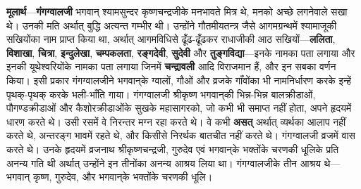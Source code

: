 \begin{sloppypar}\justifying{}
\textbf{मूलार्थ}—\textbf{गंगग्वालजी} भगवान् श्याम\-सुन्दर कृष्ण\-चन्द्रजीके मनभावते मित्र थे, मनको अच्छे लगनेवाले सखा थे। उनकी मति अर्थात् बुद्धि अत्यन्त गम्भीर थी। उन्होंने गौतमीय\-तन्त्र जैसे आगमग्रन्थमें श्यामाजूकी सखियोंका नाम प्राप्त किया था, अर्थात् आगमविधिसे ढूँढ-ढूँढकर राधाजीकी आठ सखियों—\textbf{ललिता}, \textbf{विशाखा}, \textbf{चित्रा}, \textbf{इन्दुलेखा}, \textbf{चम्पकलता}, \textbf{रङ्गदेवी}, \textbf{सुदेवी} और \textbf{तुङ्गविद्या}—इनके नामका पता लगाया और इनकी यूथेश्वरियोंके नामका पता लगाया जिनमें \textbf{चन्द्रावली} आदि विराजमान हैं, और इन सबका वर्णन किया। इसी प्रकार गंगग्वालजीने भगवान्‌के ग्वालों, गौओं और व्रजके गाँवोंका भी नाम\-निर्धारण करके इन्हें पृथक्-पृथक् करके भली-भाँति गाया। गंगग्वालजी श्रीकृष्ण भगवान्‌की भिन्न-भिन्न बाल\-क्रीडाओं, पौगण्ड\-क्रीडाओं और कैशोर\-क्रीडाओंके सुखके महासागरको, जो कभी भी समाप्त नहीं होता, अपने हृदयमें धारण करते थे। उसी रसमें वे निरन्तर मग्न रहा करते थे। वे कभी \textbf{असत्} अर्थात् व्यर्थका आलाप नहीं करते थे, अन्तरङ्ग भावमें रहते थे, और किसीसे निरर्थक बातचीत नहीं करते थे। गंगग्वालजी व्रजमें वास करते थे। उनके हृदयमें व्रजनाथ श्रीकृष्ण\-चन्द्रजी, गुरुदेव एवं भगवान्‌के भक्तोंके चरणकी धूलिके प्रति अनन्य गति थी अर्थात् उन्होंने इन तीनोंका अनन्य आश्रय लिया था। गंगग्वालजीके तीन आश्रय थे—भगवान् कृष्ण, गुरुदेव, और भगवान्‌के भक्तोंके चरणकी धूलि।
\end{sloppypar}


